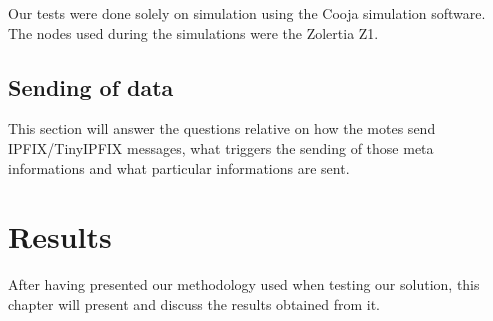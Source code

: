 Our tests were done solely on simulation using the Cooja simulation software. The nodes used during the simulations were the Zolertia Z1.

\section{Sending of data}

This section will answer the questions relative on how the motes send IPFIX/TinyIPFIX messages, what triggers the sending of those meta informations and what particular informations are sent.


\chapter{Results}

After having presented our methodology used when testing our solution, this chapter will present and discuss the results obtained from it.
